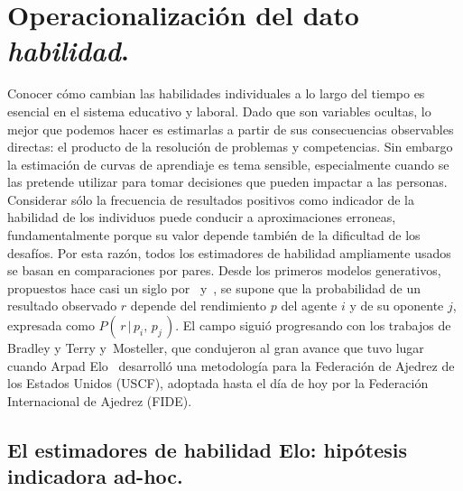 \documentclass[a4paper,11pt]{book}
\theoremstyle{definition}
\begin{document}
\section{Operacionalizaci\'on del dato \emph{habilidad}.}

Conocer c\'omo cambian las habilidades individuales a lo largo del tiempo es esencial en el sistema educativo y laboral.
%
Dado que son variables ocultas, lo mejor que podemos hacer es estimarlas a partir de sus consecuencias observables directas: el producto de la resoluci\'on de problemas y competencias.
%
Sin embargo la estimaci\'on de curvas de aprendiaje es tema sensible, especialmente cuando se las pretende utilizar para tomar decisiones que pueden impactar a las personas.
%
Considerar s\'olo la frecuencia de resultados positivos como indicador de la habilidad de los individuos puede conducir a aproximaciones erroneas, fundamentalmente porque su valor depende tambi\'en de la dificultad de los desaf\'ios.
%
Por esta raz\'on, todos los estimadores de habilidad ampliamente usados se basan en comparaciones por pares.
%
Desde los primeros modelos generativos, propuestos hace casi un siglo por~\cite{Thurstone1927} y~\cite{Zermelo1929}, se supone que la probabilidad de un resultado observado $r$ depende del rendimiento $p$ del agente $i$ y de su oponente $j$, expresada como $P(\, r \,|\, p_i, \, p_j \,)$.
%
El campo sigui\'o progresando con los trabajos de Bradley y Terry \cite{Bradley1952} y~\cite{Mosteller1951a,Mosteller1951b,Mosteller1951c}Mosteller, que condujeron al gran avance que tuvo lugar cuando Arpad Elo~\cite{Elo2008} desarroll\'o una metodolog\'ia para la Federaci\'on de Ajedrez de los Estados Unidos (USCF), adoptada hasta el d\'ia de hoy por la Federaci\'on Internacional de Ajedrez (FIDE).

\subsection{El estimadores de habilidad Elo: hip\'otesis indicadora ad-hoc.}
\end{document}
